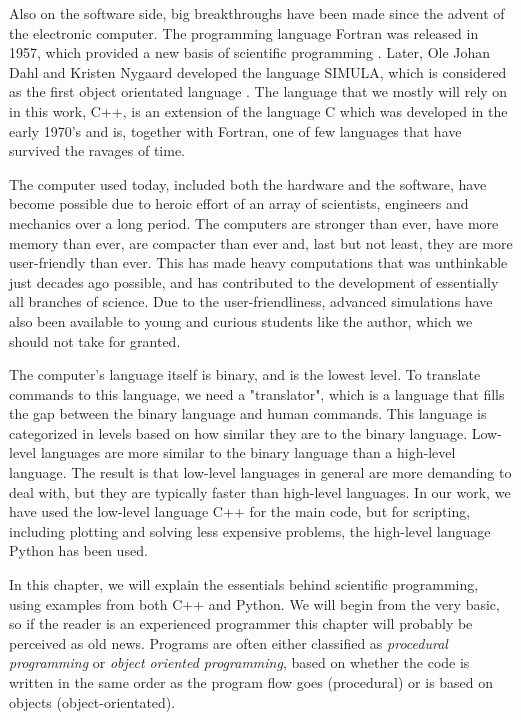 Also on the software side, big breakthroughs have been made since the advent of the electronic computer. The programming language Fortran was released in 1957, which provided a new basis of scientific programming \cite{allen_history_1981}. Later, Ole Johan Dahl and Kristen Nygaard developed the language SIMULA, which is considered as the first object orientated language \cite{holmevik_compiling_1994}. The language that we mostly will rely on in this work, C++, is an extension of the language C which was developed in the early 1970's and is, together with Fortran, one of few languages that have survived the ravages of time. 

The computer used today, included both the hardware and the software, have become possible due to heroic effort of an array of scientists, engineers and mechanics over a long period. The computers are stronger than ever, have more memory than ever, are compacter than ever and, last but not least, they are more user-friendly than ever. This has made heavy computations that was unthinkable just decades ago possible, and has contributed to the development of essentially all branches of science. Due to the user-friendliness, advanced simulations have also been available to young and curious students like the author, which we should not take for granted. 

The computer's language itself is binary, and is the lowest level. To translate commands to this language, we need a "translator", which is a language that fills the gap between the binary language and human commands. This language is categorized in levels based on how similar they are to the binary language. Low-level languages are more similar to the binary language than a high-level language. The result is that low-level languages in general are more demanding to deal with, but they are typically faster than high-level languages. In our work, we have used the low-level language C++ for the main code, but for scripting, including plotting and solving less expensive problems, the high-level language Python has been used. 

In this chapter, we will explain the essentials behind scientific programming, using examples from both C++ and Python. We will begin from the very basic, so if the reader is an experienced programmer this chapter will probably be perceived as old news. Programs are often either classified as \textit{procedural programming} or \textit{object oriented programming}, based on whether the code is written in the same order as the program flow goes (procedural) or is based on objects (object-orientated).

